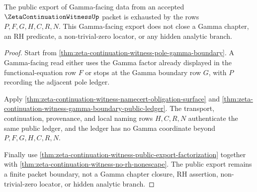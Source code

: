 \begin{theorem}
\label{thm:zeta-continuation-witness-gamma-boundary-public-export}
The public export of Gamma-facing data from an accepted $\ZetaContinuationWitnessUp$ packet is exhausted by the rows $P,F,G,H,C,R,N$. This Gamma-facing export does not close a Gamma chapter, an RH predicate, a non-trivial-zero locator, or any hidden analytic branch.
\end{theorem}
\begin{proof}
Start from \autoref{thm:zeta-continuation-witness-pole-gamma-boundary}. A Gamma-facing read either uses the Gamma factor already displayed in the functional-equation row $F$ or stops at the Gamma boundary row $G$, with $P$ recording the adjacent pole ledger.

Apply \autoref{thm:zeta-continuation-witness-namecert-obligation-surface} and \autoref{thm:zeta-continuation-witness-gamma-boundary-public-ledger}. The transport, continuation, provenance, and local naming rows $H,C,R,N$ authenticate the same public ledger, and the ledger has no Gamma coordinate beyond $P,F,G,H,C,R,N$.

Finally use \autoref{thm:zeta-continuation-witness-public-export-factorization} together with \autoref{thm:zeta-continuation-witness-no-rh-nonescape}. The public export remains a finite packet boundary, not a Gamma chapter closure, RH assertion, non-trivial-zero locator, or hidden analytic branch.
\end{proof}
